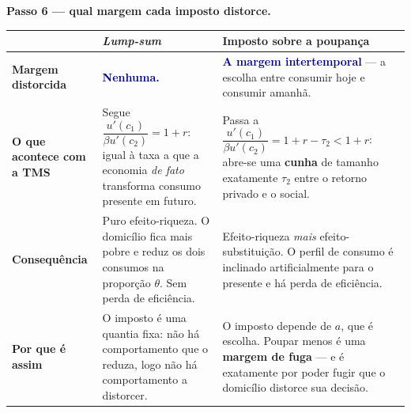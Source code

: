 \documentclass[11pt, a4paper]{article}
\newcommand{\passo}[1]{\medskip\noindent\textbf{#1}\par\nobreak}
\newcommand{\resp}[1]{%
  \ifmmode {\color{darkblue}#1}\else\textcolor{darkblue}{\textbf{#1}}\fi}
\begin{document}
\passo{Passo 6 --- qual margem cada imposto distorce.}

\begin{center}
\small
\renewcommand{\arraystretch}{1.4}
\begin{tabular}{@{}lp{5.0cm}p{6.4cm}@{}}
\toprule
& \textbf{\emph{Lump-sum}} & \textbf{Imposto sobre a poupança} \\
\midrule
\textbf{Margem distorcida}
  & \resp{Nenhuma.}
  & \resp{A margem \textbf{intertemporal}} --- a escolha entre consumir hoje e consumir amanhã. \\
\textbf{O que acontece com a TMS}
  & Segue $\dfrac{u'(c_1)}{\beta u'(c_2)}=1+r$: igual à taxa a que a economia
    \emph{de fato} transforma consumo presente em futuro.
  & Passa a $\dfrac{u'(c_1)}{\beta u'(c_2)}=1+r-\tau_2 < 1+r$: abre-se uma
    \textbf{cunha} de tamanho exatamente $\tau_2$ entre o retorno privado e o social. \\
\textbf{Consequência}
  & Puro efeito-riqueza. O domicílio fica mais pobre e reduz os dois consumos na proporção
    $\theta$. Sem perda de eficiência.
  & Efeito-riqueza \emph{mais} efeito-substituição. O perfil de consumo é inclinado
    artificialmente para o presente e há perda de eficiência. \\
\textbf{Por que é assim}
  & O imposto é uma quantia fixa: não há comportamento que o reduza, logo não há
    comportamento a distorcer.
  & O imposto depende de $a$, que é escolha. Poupar menos é uma \textbf{margem de fuga} ---
    e é exatamente por poder fugir que o domicílio distorce sua decisão. \\
\bottomrule
\end{tabular}
\end{center}
\end{document}
